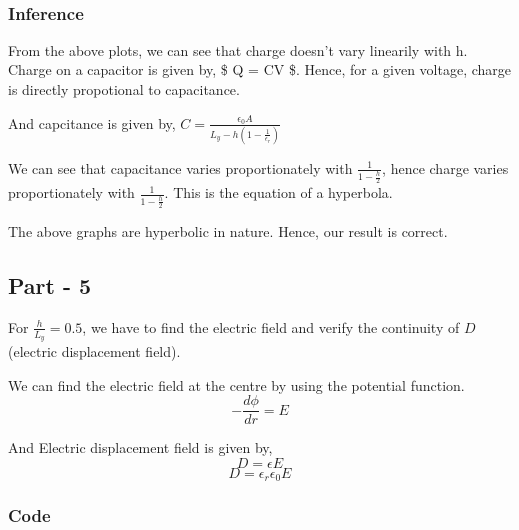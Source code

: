 \documentclass[11pt]{article}
\begin{document}
    \begin{center}
    \end{center}
    { \hspace*{\fill} \\}
    
    \hypertarget{inference}{%
\subsubsection{Inference}\label{inference}}

From the above plots, we can see that charge doesn't vary linearily with
h. Charge on a capacitor is given by, \$ Q = CV \$. Hence, for a given
voltage, charge is directly propotional to capacitance.

And capcitance is given by,
\(C=\frac{\epsilon_0 A}{L_y-h(1-\frac{1}{\epsilon_r})}\)

We can see that capacitance varies proportionately with
\(\frac{1}{1-\frac{h}{2}}\), hence charge varies proportionately with
\(\frac{1}{1-\frac{h}{2}}\). This is the equation of a hyperbola.

The above graphs are hyperbolic in nature. Hence, our result is correct.

    \hypertarget{part---5}{%
\subsection{Part - 5}\label{part---5}}

For \(\frac{h}{L_y}=0.5\), we have to find the electric field and verify
the continuity of \(D\) (electric displacement field).

We can find the electric field at the centre by using the potential
function. \[ - \frac{d \phi}{dr} = E \]

And Electric displacement field is given by, \[ D = \epsilon E \]
\[ D = \epsilon_r \epsilon_0 E \]

    \hypertarget{code}{%
\subsubsection{Code}\label{code}}
\end{document}
